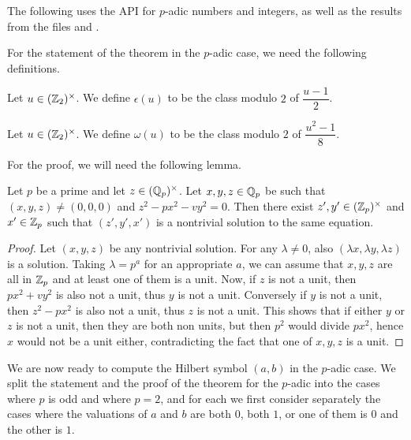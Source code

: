 The following uses the \mathlib API for $p$-adic numbers and integers, as well as the results from the files  and .


For the statement of the theorem in the $p$-adic case, we need the following definitions.


\begin{definition}
	\label{def:epsilon}
	\leanok
	Let $u \in (\mathbb{Z}_2)^\times$. We define $\epsilon(u)$ to be the class modulo $2$ of $\dfrac{u-1}{2}$.
\end{definition}

\begin{definition}
	\label{def:omega}
	\leanok
	Let $u \in (\mathbb{Z}_2)^\times$. We define $\omega(u)$ to be the class modulo $2$ of $\dfrac{u^2-1}{8}$.
\end{definition}



For the proof, we will need the following lemma.
\begin{lemma}
	\label{lem:nontrivialzero}
	\leanok
Let $p$ be a prime and let $z \in (\mathbb{Q}_p)^\times$. Let $x, y, z \in \mathbb{Q}_p$ be such that
$(x, y, z) \ne (0, 0, 0)$ and $z^2 - p x^2 - v y^2 = 0$. Then there exist
$z', y' \in (\mathbb{Z}_p)^\times$ and $x' \in \mathbb{Z}_p$ such that $(z', y', x')$ is a nontrivial solution to
the same equation.
\end{lemma}
\begin{proof}
	\leanok
	Let $(x,y,z)$ be any nontrivial solution. For any $\lambda \ne 0$, also $(\lambda x, \lambda y,
	\lambda z)$ is a solution. Taking $\lambda = p^a$ for an appropriate $a$, we can assume that
	$x,y,z$ are all in $\mathbb{Z}_p$ and at least one of them is a unit. Now, if $z$ is not a unit, then
	$px^2+vy^2$ is also not a unit, thus $y$ is not a unit. Conversely if $y$ is not a unit, then
	$z^2-px^2$ is also not a unit, thus $z$ is not a unit. This shows that if either $y$ or $z$ is not
	a unit, then they are both non units, but then $p^2$ would divide $px^2$, hence $x$ would not be a
	unit either, contradicting the fact that one of $x,y,z$ is a unit.
\end{proof}

We are now ready to compute the Hilbert symbol $(a,b)$ in the $p$-adic case.
We split the statement and the proof of the theorem for the $p$-adic into the cases where $p$ is odd
and where $p = 2$, and for each we first consider separately the cases where the valuations of $a$
and $b$ are both $0$, both $1$, or one of them is $0$ and the other is $1$.

